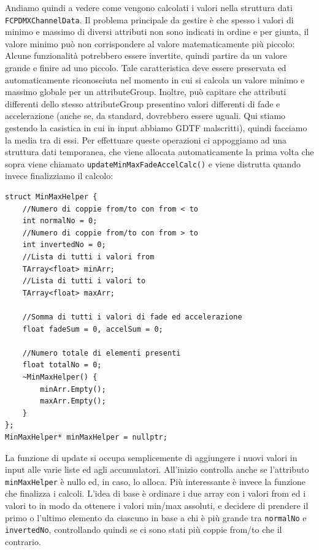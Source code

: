 \documentclass[main.tex]{subfiles}
\begin{document}
Andiamo quindi a vedere come vengono calcolati i valori nella struttura dati \lstinline{FCPDMXChannelData}. Il problema principale da gestire è che spesso i valori di minimo e massimo di diversi attributi non sono indicati in ordine e per giunta, il valore minimo può non corrispondere al valore matematicamente più piccolo: Alcune funzionalità potrebbero essere invertite, quindi partire da un valore grande e finire ad uno piccolo. Tale caratteristica deve essere preservata ed automaticamente riconosciuta nel momento in cui si calcola un valore minimo e massimo globale per un attributeGroup. Inoltre, può capitare che attributi differenti dello stesso attributeGroup presentino valori differenti di fade e accelerazione (anche se, da standard, dovrebbero essere uguali. Qui stiamo gestendo la casistica in cui in input abbiamo GDTF malscritti), quindi facciamo la media tra di essi. Per effettuare queste operazioni ci appoggiamo ad una struttura dati temporanea, che viene allocata automaticamente la prima volta che sopra viene chiamato \lstinline{updateMinMaxFadeAccelCalc()} e viene distrutta quando invece finalizziamo il calcolo:
\begin{lstlisting}
struct MinMaxHelper {
    //Numero di coppie from/to con from < to
    int normalNo = 0;
    //Numero di coppie from/to con from > to
    int invertedNo = 0;
    //Lista di tutti i valori from
    TArray<float> minArr;
    //Lista di tutti i valori to
    TArray<float> maxArr;

    //Somma di tutti i valori di fade ed accelerazione
    float fadeSum = 0, accelSum = 0;

    //Numero totale di elementi presenti
    float totalNo = 0;
    ~MinMaxHelper() {
        minArr.Empty();
        maxArr.Empty();
    }
};
MinMaxHelper* minMaxHelper = nullptr;
\end{lstlisting}
La funzione di update si occupa semplicemente di aggiungere i nuovi valori in input alle varie liste ed agli accumulatori. All'inizio controlla anche se l'attributo \lstinline{minMaxHelper} è nullo ed, in caso, lo alloca. Più interessante è invece la funzione che finalizza i calcoli. L'idea di base è ordinare i due array con i valori from ed i valori to in modo da ottenere i valori min/max assoluti, e decidere di prendere il primo o l'ultimo elemento da ciascuno in base a chi è più grande tra \lstinline{normalNo} e \lstinline{invertedNo}, controllando quindi se ci sono stati più coppie from/to  che il contrario.
\end{document}
